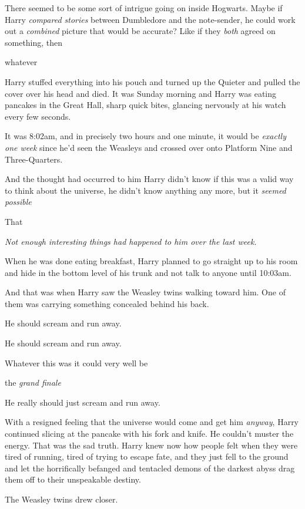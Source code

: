There seemed to be some sort of intrigue going on inside Hogwarts. Maybe if
Harry \emph{compared stories} between Dumbledore and the note-sender, he could
work out a \emph{combined} picture that would be accurate? Like if they
\emph{both} agreed on something, then{\el}

{\el} whatever{\el}

Harry stuffed everything into his pouch and turned up the Quieter and pulled
the cover over his head and died.
\sbreak
It was Sunday morning and Harry was eating pancakes in the Great Hall, sharp
quick bites, glancing nervously at his watch every few seconds.

It was 8:02am, and in precisely two hours and one minute, it would be
\emph{exactly one week} since he'd seen the Weasleys and crossed over onto
Platform Nine and Three-Quarters.

And the thought had occurred to him{\el} Harry didn't know if this was a
valid way to think about the universe, he didn't know anything any more, but it
\emph{seemed possible{\el}}

That{\el}

\emph{Not enough interesting things had happened to him over the last week.}

When he was done eating breakfast, Harry planned to go straight up to his room
and hide in the bottom level of his trunk and not talk to anyone until 10:03am.

And that was when Harry saw the Weasley twins walking toward him. One of them
was carrying something concealed behind his back.

He should scream and run away.

He should scream and run away.

Whatever this was{\el} it could very well be{\el}

{\el} the \emph{grand finale{\el}}

He really should just scream and run away.

With a resigned feeling that the universe would come and get him \emph{anyway},
Harry continued slicing at the pancake with his fork and knife. He couldn't
muster the energy. That was the sad truth. Harry knew now how people felt when
they were tired of running, tired of trying to escape fate, and they just fell
to the ground and let the horrifically befanged and tentacled demons of the
darkest abyss drag them off to their unspeakable destiny.

The Weasley twins drew closer.


